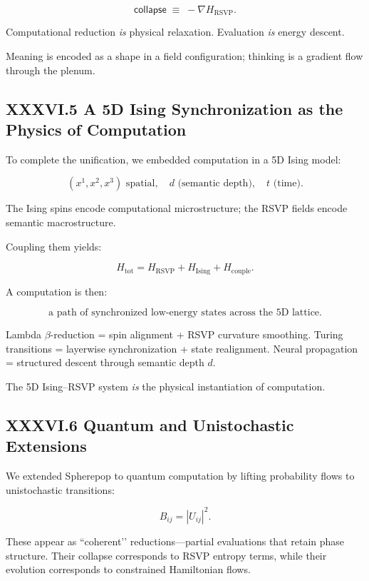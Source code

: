 \documentclass[12pt,letterpaper]{article}
\begin{document}
\[
\mathsf{collapse}
\;\equiv\;
-\nabla H_{\text{RSVP}}.
\]

Computational reduction \emph{is} physical relaxation.  
Evaluation \emph{is} energy descent.

Meaning is encoded as a shape in a field configuration;
thinking is a gradient flow through the plenum.

\subsection{XXXVI.5 A 5D Ising Synchronization as the Physics of Computation}

To complete the unification, we embedded computation in a 5D Ising model:

\[
(x^1, x^2, x^3) \text{ spatial},\quad 
d \text{ (semantic depth)},\quad
t \text{ (time)}.
\]

The Ising spins encode computational microstructure;
the RSVP fields encode semantic macrostructure.

Coupling them yields:

\[
H_{\text{tot}} = 
H_{\text{RSVP}}
+ H_{\text{Ising}}
+ H_{\text{couple}}.
\]

A computation is then:

\[
\boxed{
\text{a path of synchronized low-energy states across the 5D lattice}.
}
\]

Lambda $\beta$-reduction  
= spin alignment + RSVP curvature smoothing.  
Turing transitions  
= layerwise synchronization + state realignment.  
Neural propagation  
= structured descent through semantic depth $d$.

The 5D Ising–RSVP system \emph{is} the physical instantiation of computation.

\subsection{XXXVI.6 Quantum and Unistochastic Extensions}

We extended Spherepop to quantum computation by lifting probability flows 
to unistochastic transitions:

\[
B_{ij} = |U_{ij}|^2.
\]

These appear as ``coherent’’ reductions—partial evaluations that retain phase structure.
Their collapse corresponds to RSVP entropy terms, 
while their evolution corresponds to constrained Hamiltonian flows.
\end{document}
